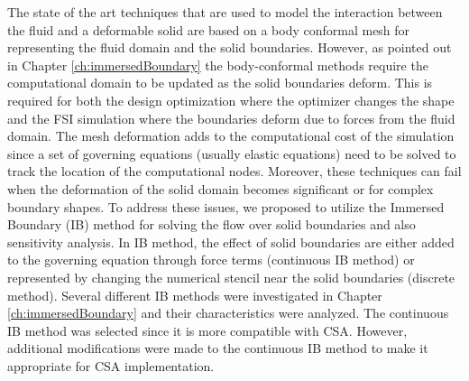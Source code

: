 The state of the art techniques that are used to model the interaction between the fluid and a deformable solid are based on a body conformal mesh for representing the fluid domain and the solid boundaries. However, as pointed out in Chapter \ref{ch:immersedBoundary} the body-conformal methods require the computational domain to be updated as the solid boundaries deform. This is required for both the design optimization where the optimizer changes the shape and the FSI simulation where the boundaries deform due to forces from the fluid domain. The mesh deformation adds to the computational cost of the simulation since a set of governing equations (usually elastic equations) need to be solved to track the location of the computational nodes. Moreover, these techniques can fail when the deformation of the solid domain becomes significant or for complex boundary shapes. To address these issues, we proposed to utilize the Immersed Boundary (IB) method for solving the flow over solid boundaries and also sensitivity analysis. In IB method, the effect of solid boundaries are either added to the governing equation through force terms (continuous IB method) or represented by changing the numerical stencil near the solid boundaries (discrete method). Several different IB methods were investigated in Chapter \ref{ch:immersedBoundary} and their characteristics were analyzed. The continuous IB method was selected since it is more compatible with CSA. However, additional modifications were made to the continuous IB method to make it appropriate for CSA implementation.

